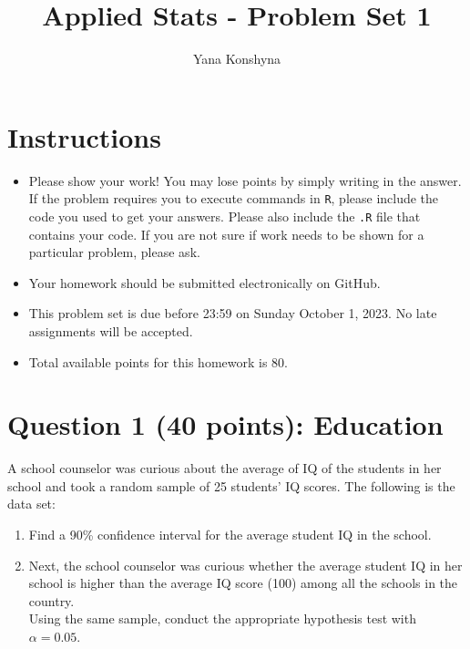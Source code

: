 \documentclass[12pt,letterpaper]{article}
\title{Applied Stats - Problem Set 1}
\author{Yana Konshyna}
\begin{document}
	\maketitle
	
	\section*{Instructions}
	\begin{itemize}
	\item Please show your work! You may lose points by simply writing in the answer. If the problem requires you to execute commands in \texttt{R}, please include the code you used to get your answers. Please also include the \texttt{.R} file that contains your code. If you are not sure if work needs to be shown for a particular problem, please ask.
\item Your homework should be submitted electronically on GitHub.
\item This problem set is due before 23:59 on Sunday October 1, 2023. No late assignments will be accepted.
\item Total available points for this homework is 80.
	\end{itemize}
	
	\vspace{1cm}
	\section*{Question 1 (40 points): Education}

A school counselor was curious about the average of IQ of the students in her school and took a random sample of 25 students' IQ scores. The following is the data set:\\


  

\vspace{1cm}

\begin{enumerate}
	\item Find a 90\% confidence interval for the average student IQ in the school.\\
	
	\item Next, the school counselor was curious  whether  the average student IQ in her school is higher than the average IQ score (100) among all the schools in the country.\\ 
	
	\noindent Using the same sample, conduct the appropriate hypothesis test with $\alpha=0.05$.
\end{enumerate}
\end{document}
